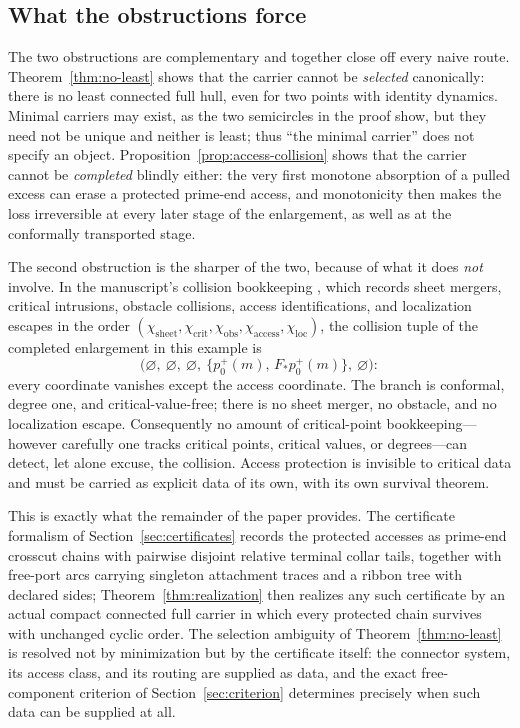 \documentclass[11pt,reqno]{amsart}
\theoremstyle{definition}
\theoremstyle{remark}
\begin{document}
\subsection{What the obstructions force}\label{subsec:B-moral}

The two obstructions are complementary and together close off every naive
route. Theorem~\ref{thm:no-least} shows that the carrier cannot be
\emph{selected} canonically: there is no least connected full hull, even for
two points with identity dynamics.  Minimal carriers may exist, as the two
semicircles in the proof show, but they need not be unique and neither is
least; thus ``the minimal carrier'' does not specify an object.
Proposition~\ref{prop:access-collision} shows that the carrier cannot be
\emph{completed} blindly either: the very first monotone absorption of a
pulled excess can erase a protected prime-end access, and monotonicity then
makes the loss irreversible at every later stage of the enlargement, as well
as at the conformally transported stage.

The second obstruction is the sharper of the two, because of what it does
\emph{not} involve. In the manuscript's collision bookkeeping \cite{MWman},
which records sheet mergers, critical intrusions, obstacle collisions, access
identifications, and localization escapes in the order
$(\chi_{\mathrm{sheet}},\chi_{\mathrm{crit}},\chi_{\mathrm{obs}},
\chi_{\mathrm{access}},\chi_{\mathrm{loc}})$, the collision tuple of the
completed enlargement in this example is
\[
\bigl(\varnothing,\ \varnothing,\ \varnothing,\
\{p_0^{+}(m),\,F_{*}p_0^{+}(m)\},\ \varnothing\bigr):
\]
every coordinate vanishes except the access coordinate. The
branch is conformal, degree one, and critical-value-free; there is no sheet
merger, no obstacle, and no localization escape. Consequently no amount of
critical-point bookkeeping---however carefully one tracks critical points,
critical values, or degrees---can detect, let alone excuse, the collision.
Access protection is invisible to critical data and must be carried as
explicit data of its own, with its own survival theorem.

This is exactly what the remainder of the paper provides. The certificate
formalism of Section~\ref{sec:certificates} records the protected accesses as
prime-end crosscut chains \cite{Pom92} with pairwise disjoint relative
terminal collar tails, together with free-port arcs carrying singleton attachment traces
and a ribbon tree with declared sides; Theorem~\ref{thm:realization} then
realizes any such certificate by an actual compact connected full carrier in
which every protected chain survives with unchanged cyclic order. The
selection ambiguity of Theorem~\ref{thm:no-least} is resolved not by
minimization but by the certificate itself: the connector system, its access
class, and its routing are supplied as data, and the exact free-component
criterion of Section~\ref{sec:criterion} determines precisely when such data
can be supplied at all.
\end{document}
